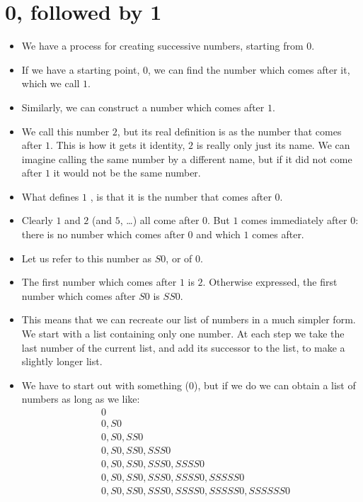 \chapter{0, followed by 1}
\label{successor}

\begin{itemize}
\item
We have a process for creating successive numbers, starting from $0$. 
\item
If we have a starting point, $0$, we can find the number which comes after it, which we call $1$.
\item
Similarly, we can construct a number which comes after $1$.
\item
We call this number $2$, but its real definition is as the number that comes after $1$. This is how it gets it identity, $2$ is really only just its name. We can imagine calling the same number by a different name, but if it did not come after $1$ it would not be the same number.
\item
What defines $1$ , is that it is the  number that comes after $0$. 
\item
Clearly $1$ and $2$ (and $5$, \ldots) all come after $0$. But $1$ comes immediately after $0$: there is no number which comes after $0$ and which $1$ comes after. 
\item
Let us refer to this number as $S0$, or  of $0$. 
\item
The first number which comes after $1$ is $2$. Otherwise expressed, the first number which comes after $S0$ is $SS0$.
\item
This means that we can recreate our list of numbers in a much simpler form. We start with a list containing only one number. At each step we take the last number of the current list, and add its successor to the list, to make a slightly longer list. 
\item
We have to start out with something (0), but if we do we can obtain a list of numbers as long as we like:
\begin{align*}
&0\\
&0, S0\\
&0, S0, SS0\\
&0, S0, SS0, SSS0\\
&0, S0, SS0, SSS0, SSSS0\\
&0, S0, SS0, SSS0, SSSS0, SSSSS0\\
&0, S0, SS0, SSS0, SSSS0, SSSSS0, SSSSSS0\\

\end{align*}
\end{itemize}
